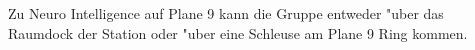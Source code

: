 
Zu Neuro Intelligence auf Plane 9 kann die Gruppe entweder "uber das Raumdock der Station oder "uber eine Schleuse am Plane 9 Ring kommen. 
